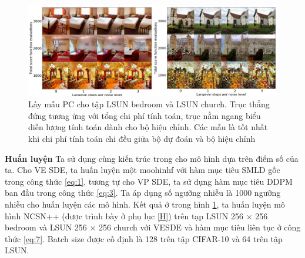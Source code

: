 \documentclass{article} %
\begin{document}
\begin{figure}[h!]
    \centering
    \includegraphics[width=0.8\linewidth]{figures/9.png}
    \caption{Lấy mẫu PC cho tập LSUN bedroom và LSUN church.
    Trục thẳng đứng tương ứng với tổng chi phí tính toán, trục nằm ngang biểu diễn lượng tính toán dành cho bộ hiệu chỉnh.
    Các mẫu là tốt nhất khi chi phí tính toán chi đều giữa bộ dự đoán và bộ hiệu chỉnh}
    \label{fig:9}
\end{figure}

\textbf{Huấn luyện} Ta sử dụng cùng kiến trúc trong \citep{ho2020denoising} cho mô hình dựa trên điểm số của ta.
Cho VE SDE, ta huấn luyện một moohinhf với hàm mục tiêu SMLD gốc trong công thức \ref{eq:1}, tương tự cho VP SDE,
ta sử dụng hàm mục tiêu DDPM ban đầu trong công thức \ref{eq:3}.
Ta áp dụng số ngưỡng nhiễu là 1000 ngưỡng nhiễu cho huấn luyện các mô hình.
Kết quả ở trong hình \ref{fig:9}, ta huấn luyện mô hình NCSN++ (được trình bày ở phụ lục \ref{H}) trên tạp LSUN 256 $\times$ 256 bedroom và LSUN 256 $\times$ 256 church \citep{yu2015lsun} với VESDE và hàm mục tiêu liên tục ở công thức \ref{eq:7}.
Batch size được cố định là 128 trên tập CIFAR-10 và 64 trên tập LSUN.
\end{document}
